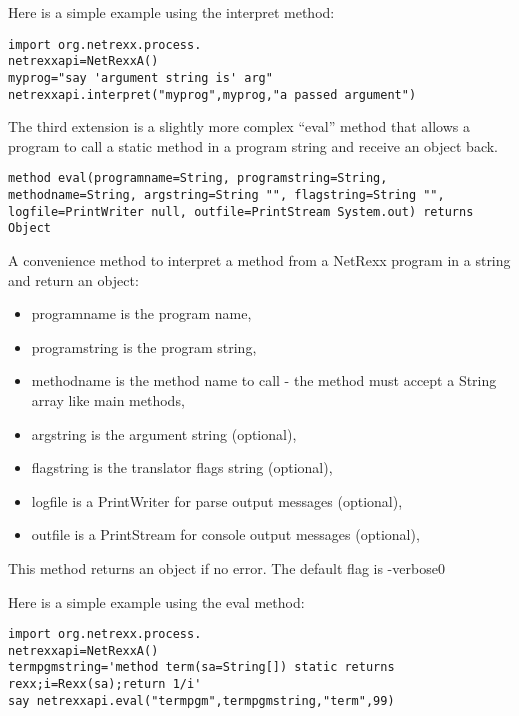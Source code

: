 Here is a simple example using the interpret method:
\begin{lstlisting}[label=stringexample,caption=interpret from string]
import org.netrexx.process.
netrexxapi=NetRexxA()
myprog="say 'argument string is' arg"
netrexxapi.interpret("myprog",myprog,"a passed argument")
\end{lstlisting}
The third extension is a slightly more complex “eval” method that allows a program to call a static method in a program string and receive an object back.

\begin{lstlisting}[label=stringevalexample,caption=eval]
method eval(programname=String, programstring=String, methodname=String, argstring=String "", flagstring=String "", logfile=PrintWriter null, outfile=PrintStream System.out) returns Object
\end{lstlisting}
A convenience method to interpret a method from a NetRexx program in a
string and return an object:
\begin{itemize}
\item programname is the program name,
\item programstring is the program string,
\item methodname is the method name to call - the method must accept a String array like main methods,
\item argstring is the argument string (optional),
\item flagstring is the translator flags string (optional),
\item logfile is a PrintWriter for parse output messages (optional),
\item outfile is a PrintStream for console output messages (optional),
\end{itemize}
This method returns an object if no error. The default flag is -verbose0


Here is a simple example using the eval method:
\begin{lstlisting}[label=evalexample,caption=eval example]
import org.netrexx.process.
netrexxapi=NetRexxA()
termpgmstring='method term(sa=String[]) static returns rexx;i=Rexx(sa);return 1/i'	
say netrexxapi.eval("termpgm",termpgmstring,"term",99)
\end{lstlisting}